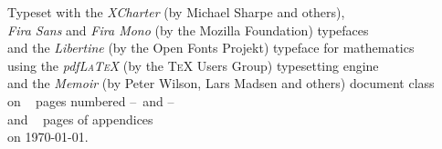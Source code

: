 \cleartoverso
\thispagestyle{empty}

\vspace*{0pt plus 1fill}

{ \centering\footnotesize
  Typeset with the \emph{XCharter} (by Michael Sharpe and others),\\
  \emph{Fira Sans} and \emph{Fira Mono} (by the Mozilla Foundation) typefaces\\
  and the \emph{Libertine} (by the Open Fonts Projekt) typeface for mathematics\\
  using the \emph{pdfL\textsc{a}T\textsc{e}X} (by the T\textsc{e}X Users Group) typesetting engine\\
  and the \emph{Memoir} (by Peter Wilson, Lars Madsen and others) document class\\
  on \PagesWithoutAppendix\  pages numbered \FirstFrontMatterPage--\LastFrontMatterPage\ and \FirstMainMatterPage--\LastMainMatterPage\\
  and \PagesAppendix\  pages of appendices\\
  on \today.
  \par
}

